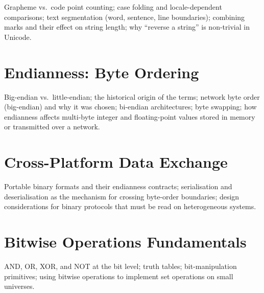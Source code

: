 Grapheme vs.\ code point counting; case folding and locale-dependent
comparisons; text segmentation (word, sentence, line boundaries); combining
marks and their effect on string length; why ``reverse a string'' is
non-trivial in Unicode.


%

\chapter{Endianness: Byte Ordering}
\label{ch:endianness}

Big-endian vs.\ little-endian; the historical origin of the terms; network
byte order (big-endian) and why it was chosen; bi-endian architectures;
byte swapping; how endianness affects multi-byte integer and floating-point
values stored in memory or transmitted over a network.

\chapter{Cross-Platform Data Exchange}
\label{ch:cross-platform}

Portable binary formats and their endianness contracts; serialisation and
deserialisation as the mechanism for crossing byte-order boundaries; design
considerations for binary protocols that must be read on heterogeneous
systems.


%

\chapter{Bitwise Operations Fundamentals}
\label{ch:bitwise-ops}

AND, OR, XOR, and NOT at the bit level; truth tables; bit-manipulation
primitives; using bitwise operations to implement set operations on small
universes.

